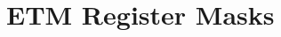 \hypertarget{group___e_t_m___register___masks}{}\section{E\+TM Register Masks}
\label{group___e_t_m___register___masks}
